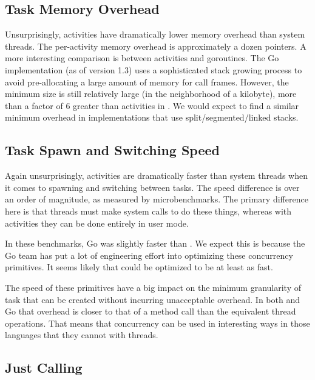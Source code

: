 \documentclass[preprint, 10pt, numbers]{sigplanconf}
\begin{document}
\subsection{Task Memory Overhead}

Unsurprisingly, activities have dramatically lower memory overhead than system threads.
The per-activity memory overhead is approximately a dozen pointers.
A more interesting comparison is between activities and goroutines.
The Go implementation (as of version 1.3) uses a sophisticated stack growing process to avoid pre-allocating a large amount of memory for call frames.
However, the minimum size is still relatively large (in the neighborhood of a kilobyte), more than a factor of 6 greater than activities in \charcoal{}.
We would expect to find a similar minimum overhead in implementations that use split/segmented/linked stacks.


\subsection{Task Spawn and Switching Speed}

Again unsurprisingly, activities are dramatically faster than system threads when it comes to spawning and switching between tasks.
The speed difference is over an order of magnitude, as measured by microbenchmarks.
The primary difference here is that threads must make system calls to do these things, whereas with activities they can be done entirely in user mode.

In these benchmarks, Go was slightly faster than \charcoal{}.
We expect this is because the Go team has put a lot of engineering effort into optimizing these concurrency primitives.
It seems likely that \charcoal{} could be optimized to be at least as fast.

The speed of these primitives have a big impact on the minimum granularity of task that can be created without incurring unacceptable overhead.
In both \charcoal{} and Go that overhead is closer to that of a method call than the equivalent thread operations.
That means that concurrency can be used in interesting ways in those languages that they cannot with threads.

\subsection{Just Calling}
\end{document}
